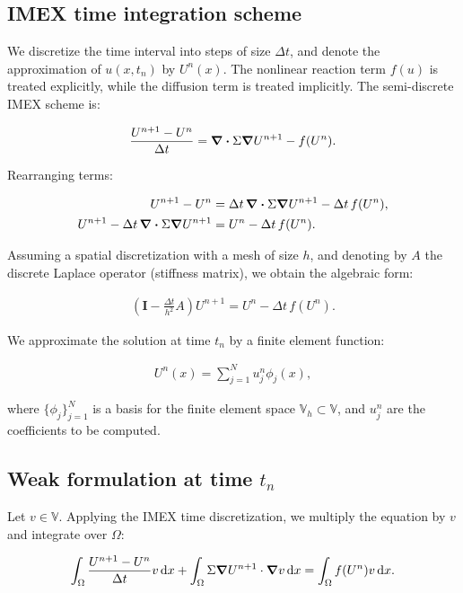 \documentclass[unicode,11pt,a4paper,oneside,numbers=endperiod,openany]{article}
\begin{document}
\subsection{IMEX time integration scheme}

We discretize the time interval into steps of size $\Delta t$, and
denote the approximation of $u(x, t_n)$ by $U^n(x)$. The
nonlinear reaction term $f(u)$ is treated explicitly, while the
diffusion term is treated implicitly. The semi-discrete IMEX scheme is:

\begin{align*}
	\frac{U^{n+1} - U^n}{\Delta t} = \divergence \Sigma \grad U^{n+1} - f(U^n).
\end{align*}

Rearranging terms:

\begin{align*}
	U^{n+1} - U^n                                         & = \Delta t\, \divergence \Sigma \grad U^{n+1} - \Delta t\, f(U^n), \\
	U^{n+1} - \Delta t\, \divergence \Sigma \grad U^{n+1} & = U^n - \Delta t\, f(U^n).
\end{align*}

Assuming a spatial discretization with a mesh of size $h$, and denoting
by $A$ the discrete Laplace operator (stiffness matrix), we
obtain the algebraic form:

\begin{align*}
	(\mathbf I - \frac{\Delta t}{h^2} A) U^{n+1} = U^n - \Delta t\, f(U^n).
\end{align*}

We approximate the solution at time $t_n$ by a finite element function:

\begin{align*}
	U^n(x) = \sum_{j=1}^{N} u_j^n \phi_j(x),
\end{align*}

where $\{\phi_j\}_{j=1}^N$ is a basis for the finite element space
$\mathbb{V}_h \subset \mathbb{V}$, and $u_j^n$ are the
coefficients to be computed.


\subsection{Weak formulation at time $t_n$}

Let $v \in \mathbb{V}$. Applying the IMEX time discretization, we multiply the equation by
$v$ and integrate over $\Omega$:

\begin{align*}
	\int_\Omega \frac{U^{n+1} - U^n}{\Delta t} v\,\diffd x +
	\int_\Omega \Sigma \grad U^{n+1} \cdot \grad v\,\diffd x =
	\int_\Omega f(U^n) v\,\diffd x.
\end{align*}
\end{document}

